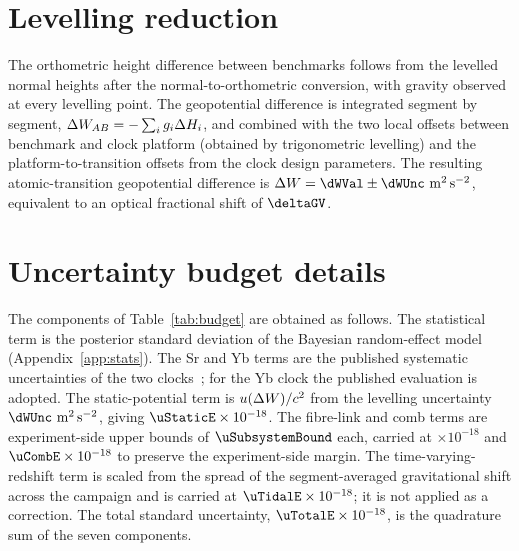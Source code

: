 \section{Levelling reduction}
\label{app:levelling}

The orthometric height difference between benchmarks follows from the
levelled normal heights after the normal-to-orthometric conversion,
with gravity observed at every levelling point. The geopotential
difference is integrated segment by segment,
$\Delta W_{AB} = -\sum_i g_i \Delta H_i$, and combined with the two local
offsets between benchmark and clock platform (obtained by
trigonometric levelling) and the platform-to-transition offsets from
the clock design parameters. The resulting atomic-transition
geopotential difference is $\dW = \dWVal \pm \dWUnc~\mathrm{m^2\,s^{-2}}$,
equivalent to an optical fractional shift of $\deltaGV$.

\section{Uncertainty budget details}
\label{app:budget}

The components of Table~\ref{tab:budget} are obtained as follows.
The statistical term is the posterior standard deviation of the
Bayesian random-effect model (Appendix~\ref{app:stats}). The Sr and
Yb terms are the published systematic uncertainties of the two
clocks~\citep{jia2026sr, zhu2026yb}; for the Yb clock the published
evaluation is adopted. The static-potential term is
$u(\Delta W)/c^2$ from the levelling uncertainty
$\dWUnc~\mathrm{m^2\,s^{-2}}$, giving
$\uStaticE \times 10^{-18}$. The fibre-link and comb terms are
experiment-side upper bounds of $\uSubsystemBound$ each, carried at
\uLinkE $\times 10^{-18}$ and $\uCombE \times 10^{-18}$ to preserve the
experiment-side margin. The time-varying-redshift term is scaled from
the spread of the segment-averaged gravitational shift across the
campaign and is carried at $\uTidalE \times 10^{-18}$; it is not
applied as a correction. The total standard uncertainty,
$\uTotalE \times 10^{-18}$, is the quadrature sum of the seven
components.
